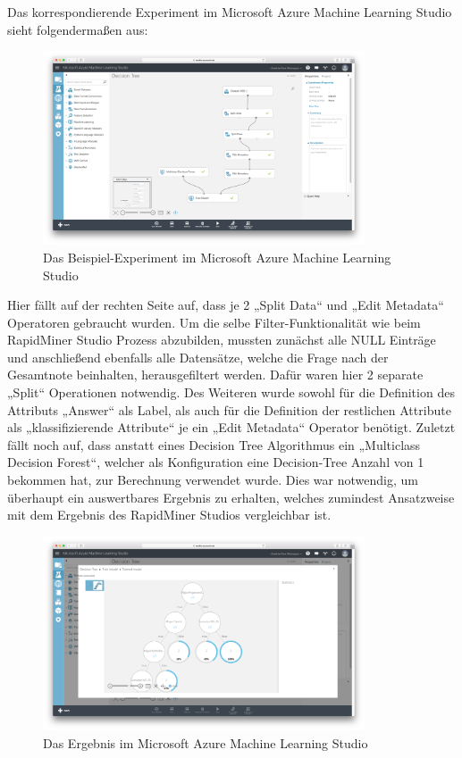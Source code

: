 Das korrespondierende Experiment im Microsoft Azure Machine Learning Studio
sieht folgendermaßen aus:

\begin{figure}[htb]
  \center
	\includegraphics[width=0.85\textwidth]{gfx/msaproc.png}
	\caption{Das Beispiel-Experiment im Microsoft Azure Machine Learning Studio}
	\label{fig:example:impl:msa:proc}
\end{figure}

Hier fällt auf der rechten Seite auf, dass je 2 „Split Data“ und „Edit Metadata“
Operatoren gebraucht wurden. Um die selbe Filter-Funktionalität wie beim
RapidMiner Studio Prozess abzubilden, mussten zunächst alle NULL Einträge und
anschließend ebenfalls alle Datensätze, welche die Frage nach der Gesamtnote
beinhalten, herausgefiltert werden. Dafür waren hier 2 separate „Split“
Operationen notwendig. Des Weiteren wurde sowohl für die Definition des
Attributs „Answer“ als Label, als auch für die Definition der restlichen
Attribute als „klassifizierende Attribute“ je ein „Edit Metadata“ Operator
benötigt. Zuletzt fällt noch auf, dass anstatt eines Decision Tree Algorithmus
ein „Multiclass Decision Forest“, welcher als Konfiguration eine Decision-Tree
Anzahl von 1 bekommen hat, zur Berechnung verwendet wurde. Dies war notwendig,
um überhaupt ein auswertbares Ergebnis zu erhalten, welches zumindest
Ansatzweise mit dem Ergebnis des RapidMiner Studios vergleichbar ist.

\begin{figure}[htb]
  \center
	\includegraphics[width=0.85\textwidth]{gfx/msares.png}
	\caption{Das Ergebnis im Microsoft Azure Machine Learning Studio}
	\label{fig:example:impl:msa:res}
\end{figure}

